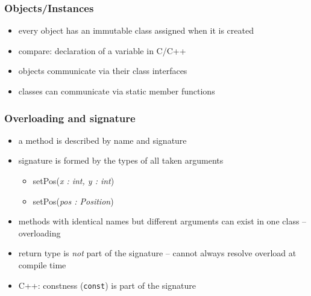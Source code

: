 \documentclass{slides}
\begin{document}
\begin{frame}
  \frametitle{Objects/Instances}

  \begin{center}
  \end{center}

  \begin{itemize}
    \item every object has an immutable class assigned when it is created
    \item compare: declaration of a variable in C/C++
    \item objects communicate via their class interfaces
    \item classes can communicate  via static member functions
  \end{itemize}
\end{frame}

\begin{frame}
  \frametitle{Overloading and signature}
  
  \begin{center}
  \end{center}

  \begin{itemize}
  \item a method is described by name and \alert{signature}
  \item signature is formed by the types of all taken arguments
    \begin{itemize}
    \item setPos(\emph{x : int, y : int})\\
    \item setPos(\emph{pos : Position})
    \end{itemize}
  \item methods with identical names but different arguments can exist in one class -- \alert{overloading} 
  \item return type is \emph{not} part of the signature -- cannot always resolve overload at compile time
  \item C++: constness (\lstinline[style=inline]!const!) is part of the signature
  \end{itemize}
\end{frame}
\end{document}
